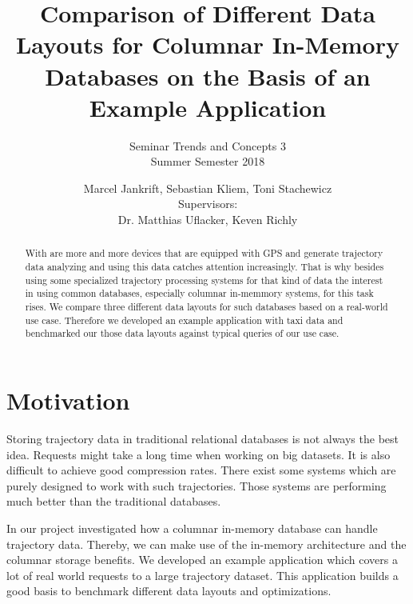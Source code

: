\documentclass[10pt]{sig-alternate}
\begin{document}

\title{
  \vspace{24pt}
  Comparison of Different Data Layouts for Columnar In-Memory Databases on the Basis of an Example Application
}
\subtitle{
  Seminar Trends and Concepts 3\\
  Summer Semester 2018
}


\author{
  Marcel Jankrift, Sebastian Kliem, Toni Stachewicz\\[12pt]
  Supervisors:\\
  Dr. Matthias Uflacker, Keven Richly
}


\maketitle
\begin{abstract}
With are more and more devices that are equipped with GPS and generate trajectory data analyzing and using this data catches attention increasingly. That is why besides using some specialized trajectory processing systems for that kind of data the interest in using common databases, especially columnar in-memmory systems, for this task rises. We compare three different data layouts for such databases based on a real-world use case. Therefore we developed an example application with taxi data and benchmarked our those data layouts against typical queries of our use case.
\end{abstract}


\section{Motivation}

Storing trajectory data in traditional relational da\-ta\-ba\-ses is not always the best idea. Requests might take a long time when working on big datasets. It is also difficult to achieve good compression rates. There exist some systems which are purely designed to work with such trajectories. Those systems are performing much better than the traditional databases.

In our project investigated how a columnar in-memory database can handle trajectory data. Thereby, we can make use of the in-memory architecture and the columnar storage benefits. We developed an example application which covers a lot of real world requests to a large trajectory dataset. This application builds a good basis to benchmark different data layouts and optimizations.
\end{document}
